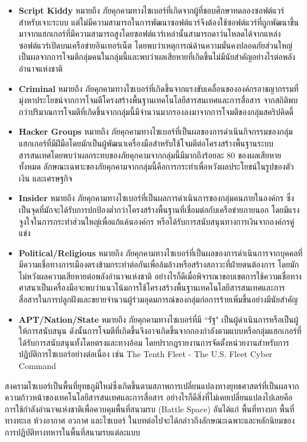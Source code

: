 \documentclass[../th_cyber_warfare_distilled.tex]{subfiles}
\begin{document}
\begin{itemize}
	\item \textbf{Script Kiddy} หมายถึง ภัยคุกคามทางไซเบอร์ที่เกิดจากผู้ที่ชอบศึกษาทดลองซอฟต์แวร์สำหรับเจาะระบบ แต่ไม่มีความสามารถในการพัฒนาซอฟต์แวร์จึงต้องใช้ซอฟต์แวร์ที่ถูกพัฒนาขึ้นมาจากแฮกเกอร์ที่มีความสามารถสูงโดยซอฟต์แวร์เหล่านั้นสามารถดาว์นโหลดได้จากแหล่งซอฟต์แวร์เปิดบนเครือข่ายอินเทอร์เน็ต โดยพบว่าเหตุการณ์ด้านความมั่นคงปลอดภัยส่วนใหญ่เป็นผลจากการโจมตีกลุ่มคนในกลุ่มนี้และพบว่าผลเสียหายที่เกิดขึ้นไม่มีนัยสำคัญอย่างไรต่อพลังอำนาจแห่งชาติ
	\item \textbf{Criminal} หมายถึง ภัยคุกคามทางไซเบอร์ที่เกิดขึ้นจากแรงขับเคลื่อนขององค์กรอาชญากรรมที่มุ่งหาประโยชน์จากการโจมตีโครงสร้างพื้นฐานเทคโนโลยีสารสนเทศและการสื่อสาร จากสถิติพบกว่าปริมาณการโจมตีที่เกิดขึ้นจากกลุ่มนี้มีจำนวนมากรองลงมาจากการโจมตีของกลุ่มสคริปคิดดี้ 
	\item \textbf{Hacker Groups} หมายถึง ภัยคุกคามทางไซเบอร์ที่เป็นผลของการดำเนินกิจกรรมของกลุ่มแฮกเกอร์ที่มีฝีมือโดยมักเป็นผู้พัฒนาเครื่องมือสำหรับใช้โจมตีต่อโครงสร้างพื้นฐานระบบสารสนเทศโดยพบว่าผลกระทบของภัยคุกคามจากกลุ่มนี้มีมากถึงร้อยละ 80 ของผลเสียหายทั้งหมด ลักษณะเฉพาะของภัยคุกคามจากกลุ่มนี้คือการกระทำเพื่อหวังผลประโยชน์ในรูปของตัวเงิน และเศรษฐกิจ
	\item \textbf{Insider} หมายถึง ภัยคุกคามทางไซเบอร์ที่เป็นผลการดำเนินการของกลุ่มคนภายในองค์กร ซึ่งเป็นจุดที่มักจะได้รับการปกป้องต่ำกว่าโครงสร้างพื้นฐานที่เชื่อมต่อกับเครือข่ายภายนอก โดยมีแรงจูงใจในการกระทำส่วนใหญ่เพื่อแก้แค้นองค์กร หรือได้รับการสนับสนุนทางการเงินจากองค์กรคู่แข่ง 
	\item \textbf{Political/Religious} หมายถึง ภัยคุกคามทางไซเบอร์ที่เป็นผลของการดำเนินการจากบุคคลที่มีความเชื่อทางการเมืองตรงข้ามกระทำต่อกันเพื่อล้มล้างหรือสร้างสภาวะที่ฝ่ายตนต้องการ โดยมักไม่หวังผลความเสียหายต่อพลังอำนาจแห่งชาติ อย่างไรก็ดีเมื่อพิจารณาขอบเขตการใช้ความเชื่อทางศาสนาเป็นเครื่องมือจะพบว่าแนวโน้มการใช้โครงสร้างพื้นฐานเทคโนโลยีสารสนเทศและการสื่อสารในการปลูกฝังและขยายจำนวนผู้ร่วมอุดมการณ์ของกลุ่มก่อการร้ายเพิ่มขึ้นอย่างมีนัยสำคัญ
	\item \textbf{APT/Nation/State} หมายถึง ภัยคุกคามทางไซเบอร์ที่มี ``รัฐ" เป็นผู้ดำเนินการหรือเป็นผู้ให้การสนับสนุน ดังนั้นการโจมตีที่เกิดขึ้นจึงอาจเกิดขึ้นจากกองกำลังตามแบบหรือกลุ่มแฮกเกอร์ที่ได้รับการสนับสนุนทั้งโดยตรงและทางอ้อม โดยปรากฎรายงานการจัดตั้งหน่วยงานสำหรับการปฏิบัติการไซเบอร์อย่างต่อเนื่อง เช่น The Tenth Fleet - The U.S. Fleet Cyber Command
\end{itemize}

สงครามไซเบอร์เป็นพื้นที่ยุทธภูมิใหม่ซึ่งเกิดขึ้นตามสภาพการเปลี่ยนแปลงทางยุทธศาสตร์ที่เป็นผลจากความก้าวหน้าของเทคโนโลยีสารสนเทศและการสื่อสาร อย่างไรก็ดีสิ่งที่ไม่เคยเปลี่ยนแปลงไปเลยคือการใช้กำลังอำนาจแห่งชาติเพื่อควบคุมพื้นที่สนามรบ (Battle Space) อันได้แก่ พื้นที่ทางบก พื้นที่ทางทะเล ห้วงอากาศ อวกาศ และไซเบอร์ ในบทต่อไปจะได้กล่าวถึงลักษณะเฉพาะและหลักนิยมของการปฏิบัติทางทหารในพื้นที่สนามรบแต่ละแบบ
\end{document}
